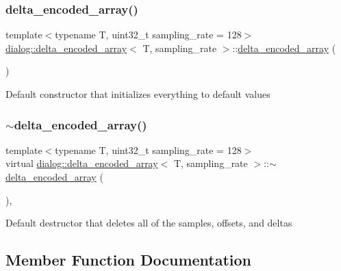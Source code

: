 \subsubsection{\texorpdfstring{delta\+\_\+encoded\+\_\+array()}{delta\_encoded\_array()}}
{\footnotesize\ttfamily template$<$typename T, uint32\+\_\+t sampling\+\_\+rate = 128$>$ \\
\hyperlink{classdialog_1_1delta__encoded__array}{dialog\+::delta\+\_\+encoded\+\_\+array}$<$ T, sampling\+\_\+rate $>$\+::\hyperlink{classdialog_1_1delta__encoded__array}{delta\+\_\+encoded\+\_\+array} (\begin{DoxyParamCaption}{ }\end{DoxyParamCaption})\hspace{0.3cm}{\ttfamily [inline]}}

Default constructor that initializes everything to default values \mbox{\label{classdialog_1_1delta__encoded__array_acdf15405bdd9cebcbe8de93a797516cb}} 
\subsubsection{\texorpdfstring{$\sim$delta\+\_\+encoded\+\_\+array()}{~delta\_encoded\_array()}}
{\footnotesize\ttfamily template$<$typename T, uint32\+\_\+t sampling\+\_\+rate = 128$>$ \\
virtual \hyperlink{classdialog_1_1delta__encoded__array}{dialog\+::delta\+\_\+encoded\+\_\+array}$<$ T, sampling\+\_\+rate $>$\+::$\sim$\hyperlink{classdialog_1_1delta__encoded__array}{delta\+\_\+encoded\+\_\+array} (\begin{DoxyParamCaption}{ }\end{DoxyParamCaption})\hspace{0.3cm}{\ttfamily [inline]}, {\ttfamily [virtual]}}

Default destructor that deletes all of the samples, offsets, and deltas 

\subsection{Member Function Documentation}
\mbox{\label{classdialog_1_1delta__encoded__array_aced4bc1f11a264fe3263b89be0e55d33}} 
